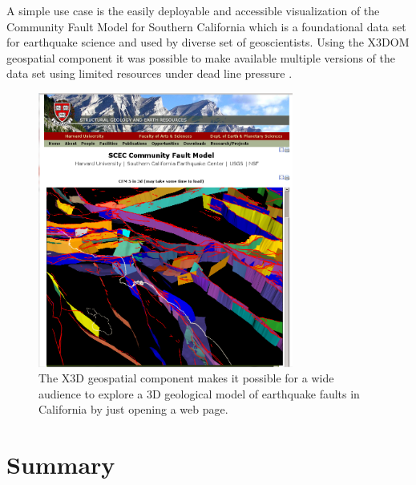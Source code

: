 \documentclass{acmsiggraph}                     %
\begin{document}
A simple use case is the easily deployable and accessible visualization of the Community Fault Model for Southern California \cite{plesch07} which is a foundational data set for earthquake science and used by diverse set of geoscientists. Using the X3DOM geospatial component it was possible to make available multiple versions of the data set using limited resources under dead line pressure \cite{sger14}.

\begin{figure}[htbp]
\centering
\includegraphics[width=3.3in]{Application_SCEC.png}
\caption{The X3D geospatial component makes it possible for a wide audience to explore a 3D geological model of earthquake faults in California by just opening a web page.}
\label{fig:Application_SCEC.png}
\end{figure}


\section{Summary}
\end{document}
